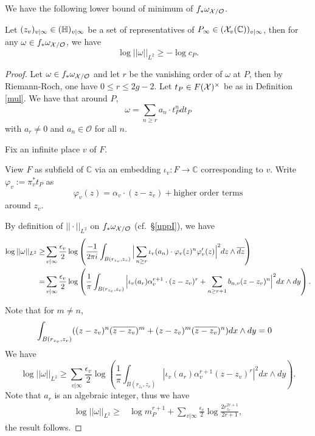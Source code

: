 \documentclass[]{amsart}
\newcommand{\BC}{{\mathbb {C}}} \newcommand{\BD}{{\mathbb {D}}}
\newcommand{\CO}{{\mathcal {O}}} \newcommand{\CP}{{\mathcal {P}}}
\newcommand{\ra}{\rightarrow} \newcommand{\imp}{\Longrightarrow}
\theoremstyle{plain}
\theoremstyle{remark} \newtheorem{remark}[thm]{Remark}
\theoremstyle{remark} \newtheorem{exercise}{Exercise}
\theoremstyle{remark} \newtheorem{example}{Example}
\numberwithin{equation}{section}
\begin{document}
We have the following lower bound of minimum of $f_*\omega_{\CX/\CO}$.
 \begin{prop}\label{mainrpt}
Let $(z_v)_{v|\infty}\in ({\mathbb {H}})_{v|\infty}$ be a set of representatives of $P_\infty\in (\CX_v(\BC))_{v|\infty}$, then for any $\omega\in f_*\omega_{\CX/\CO}$, we have
\[\log||\omega||_{L^2}\geq  -\log c_P.\]
\end{prop}
\begin{proof}
Let $\omega\in f_*\omega_{\CX/\CO}$ and let $r$ be the vanishing order of $\omega$ at $P$, then by Riemann-Roch, one have $0\leq r\leq 2g-2$. Let $t_P\in F({\mathcal {X}})^\times$ be as in Definition \ref{mul}. We have that around $P$, \[\omega=\sum_{n\geq r}a_n\cdot t_P^n d t_P\] with $a_r\neq 0$ and $a_n\in \CO$ for all $n$. 


Fix an infinite place $v$ of $F$.

View $F$ as subfield of $\BC$ via an embedding $\iota_v: F\ra \BC$ corresponding to $v$.
 Write $\varphi_v:=\pi_v^{*}t_P$ as \[\varphi_v(z)=\alpha_v\cdot(z-z_v)+\text{higher order terms}\] around $z_v$.

By definition of $||\cdot||_{L^2}$ on $f_*\omega_{\CX/\CO}$ (cf.~\S\ref{uppI}), we have
 \[\begin{aligned}
  \log||\omega||_{L^2}\geq& \sum_{v|\infty}\frac{\epsilon_v}{2}\log \left(\frac{-1}{2\pi i}\int_{B(r_{z_v},z_v)}\Big|\sum_{n\geq r}\iota_v(a_n)\cdot \varphi_v(z)^n\varphi_v'(z)\Big|^2dz\wedge \overline{dz}\right)\\
=&\sum_{v|\infty}\frac{\epsilon_v}{2}\log\left(\frac{1}{\pi}\int_{B(r_{z_{v}},z_v)}\Big|\iota_v(a_{r})\alpha_v^{r+1}\cdot(z-z_v)^r+\sum_{n\geq r+1}b_{n,v} (z-z_v)^n\Big|^2{dx\wedge dy}\right).
 \end{aligned}\]
 
Note that for $m\neq n$, 
\[\begin{aligned}
   &\int_{B(r_{z_v},z_v)}((z-z_v)^n(\overline{z-z_v})^m+(z-z_v)^m(\overline{z-z_v})^n)dx\wedge dy=0
\end{aligned}
\]
We have  
\[\log||\omega||_{L^2}\geq \sum_{v|\infty}\frac{\epsilon_v}{2}\log\left(\frac{1}{\pi}\int_{B(r_{z_{v}},z_v)}|\iota_v(a_{r})\alpha_v^{r+1}(z-z_v)^r|^2dx\wedge dy\right).\]  
Note that $a_r$ is an algebraic integer, thus we have 
\[\begin{aligned}
 \log||\omega||_{L^2}\geq&  \log m_P^{r+1}+\sum_{v|\infty}\frac{\epsilon_v}{2}\log \frac{2r_{z_v}^{2r+1}}{2r+1},
\end{aligned}
\]the result follows.
\end{proof}
\end{document}

